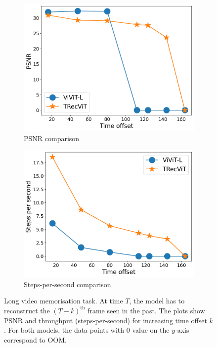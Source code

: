\begin{figure}[t]
\centering
\begin{subfigure}{0.48\linewidth}
    \centering
    \includegraphics[width=\textwidth]{img/psnr.png}
    \caption{PSNR comparison}
\end{subfigure}%
\hfill
\begin{subfigure}{0.48\linewidth}
    \centering
    \includegraphics[width=\textwidth]{img/sps.png} 
    \caption{Steps-per-second comparison}
\end{subfigure}
\caption{Long video memorisation task. At time $T$, the model has to reconstruct the $(T-k)^\text{th}$ frame seen in the past. The plots show PSNR and throughput (steps-per-second) for increasing time offset $k$. For both models, the data points with $0$ value on the $y$-axis correspond to OOM.
}
\label{fig:psnr}
\end{figure}

